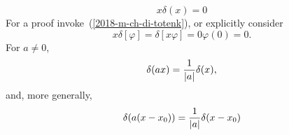  \begin{equation}
 x\delta (x)=0
 \end{equation}
{\color{OliveGreen}
\bproof
For a proof invoke~(\ref{2018-m-ch-di-totenk}), or explicitly consider
 \begin{equation}
x \delta
[\varphi ]
=
\delta
\left[  x  \varphi \right]
=
0\varphi(0) = 0.
 \end{equation}
\eproof
}
For $a\neq 0$,
 \begin{equation}
 \delta (ax)={1\over \vert a\vert }\delta (x),
\label{2011-m-distdp}
 \end{equation}
and, more generally,
 \begin{equation}
 \delta (a(x-x_0))={1\over \vert a\vert }\delta (x-x_0)
\label{2011-m-distdpmg}
 \end{equation}

